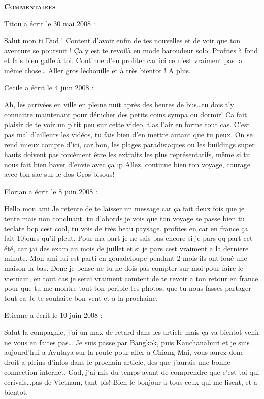 \bigskip
\textbf{\textsc{Commentaires}}

\medskip
Titou a écrit le 30 mai 2008 :
\begin{displayquote}
Salut mon ti Dud !
Content d'avoir enfin de tes nouvelles et de voir que ton aventure se poursuit ! Ça y est te revoilà en mode baroudeur solo. Profites à fond et fais bien gaffe à toi.
Continue d'en profiter car ici ce n'est vraiment pas la même chose\dots
Aller gros léchouille et à très bientot !
A plus.
\end{displayquote}

\medskip
Cecile a écrit le 4 juin 2008 :
\begin{displayquote}
Ah, les arrivées en ville en pleine nuit après des heures de bus\dots tu dois t'y connaitre maintenant pour dénicher des petits coins sympa ou dormir!
Ca fait plaisir de te voir un p'tit peu sur cette video, t'as l'air en forme tout cas. C'est pas mal d'ailleurs les vidéos, tu fais bien d'en mettre autant que tu peux. On se rend mieux compte d'ici, car bon, les plages paradisiaques ou les buildings super hauts doivent pas forcément être les extraits les plus représentatifs, même si tu nous fait bien baver d'envie avec ça :p
Allez, continue bien ton voyage, courage avec ton sac sur le dos
Gros bisous!
\end{displayquote}

\medskip
Florian a écrit le 8 juin 2008 :
\begin{displayquote}
Hello mon ami
Je retente de te laisser un message car ça fait deux fois que je tente mais non concluant. tu d'abords je vois que ton voyage se passe bien tu teclate bcp cest cool, tu vois de très beau paysage. profites en car en france ça fait 10jours qu'il pleut.
Pour ma part je ne sais pas encore si je pars qq part cet été, car jai des exam au mois de juillet et si je pars cest vraiment a la derniere minute.
Mon ami lui est parti en gouadeloupe pendant 2 mois ils ont loué une maison la bas.
Donc je pense ue tu ne dois pas compter sur moi pour faire le vietnam, en tout cas je serai vraiment comtent de te revoir a ton retour en france pour que tu me montre tout ton periple tes photos, que tu nous fasses partager tout ca
Je te souhaite bon vent et a la prochaine.
\end{displayquote}

\medskip
Etienne a écrit le 10 juin 2008 :
\begin{displayquote}
Salut la compagnie, j'ai un max de retard dans les article mais ça va bientot venir ne vous en faites pas\dots
Je suis passe par Bangkok, puis Kanchanaburi et je suis aujourd'hui a Ayutaya sur la route pour aller a Chiang Mai, vous aurez donc droit a pleins d'infos dans le prochain article, des que j'aurais une bonne connection internet.
Gad, j'ai mis du temps avant de comprendre que c'est toi qui ecrivais\dots pas de Vietnam, tant pis!
Bien le bonjour a tous ceux qui me lisent, et a bientot.
\end{displayquote}

